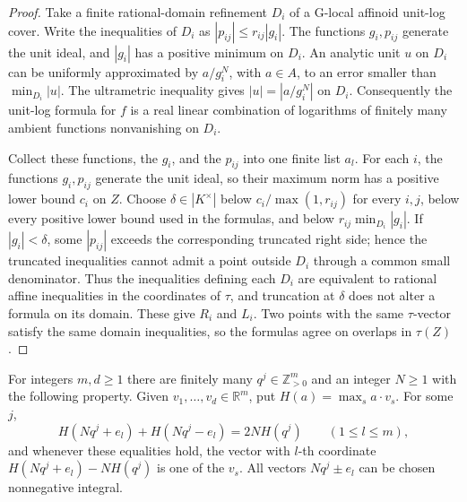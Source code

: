 \begin{proof}
Take a finite rational-domain refinement $D_i$ of a G-local affinoid unit-log cover. Write the inequalities of $D_i$ as $|p_{ij}|\leq r_{ij}|g_i|$. The functions $g_i,p_{ij}$ generate the unit ideal, and $|g_i|$ has a positive minimum on $D_i$. An analytic unit $u$ on $D_i$ can be uniformly approximated by $a/g_i^N$, with $a\in A$, to an error smaller than $\min_{D_i}|u|$. The ultrametric inequality gives $|u|=|a/g_i^N|$ on $D_i$. Consequently the unit-log formula for $f$ is a real linear combination of logarithms of finitely many ambient functions nonvanishing on $D_i$.

Collect these functions, the $g_i$, and the $p_{ij}$ into one finite list $a_l$. For each $i$, the functions $g_i,p_{ij}$ generate the unit ideal, so their maximum norm has a positive lower bound $c_i$ on $Z$. Choose $\delta\in|K^\times|$ below $c_i/\max(1,r_{ij})$ for every $i,j$, below every positive lower bound used in the formulas, and below $r_{ij}\min_{D_i}|g_i|$. If $|g_i|<\delta$, some $|p_{ij}|$ exceeds the corresponding truncated right side; hence the truncated inequalities cannot admit a point outside $D_i$ through a common small denominator. Thus the inequalities defining each $D_i$ are equivalent to rational affine inequalities in the coordinates of $\tau$, and truncation at $\delta$ does not alter a formula on its domain. These give $R_i$ and $L_i$. Two points with the same $\tau$-vector satisfy the same domain inequalities, so the formulas agree on overlaps in $\tau(Z)$.
\end{proof}

\begin{lemma}\label{lem:supplied-p061-support-vector-selection}
For integers $m,d\geq1$ there are finitely many $q^j\in\mathbb Z_{>0}^m$ and an integer $N\geq1$ with the following property. Given $v_1,\ldots,v_d\in\mathbb R^m$, put $H(a)=\max_s a\cdot v_s$. For some $j$,
\begin{equation}\label{eq:supplied-p061-support-vector-equality}
 H(Nq^j+e_l)+H(Nq^j-e_l)=2NH(q^j)\qquad(1\leq l\leq m),
\end{equation}
and whenever these equalities hold, the vector with $l$-th coordinate $H(Nq^j+e_l)-NH(q^j)$ is one of the $v_s$. All vectors $Nq^j\pm e_l$ can be chosen nonnegative integral.
\end{lemma}

